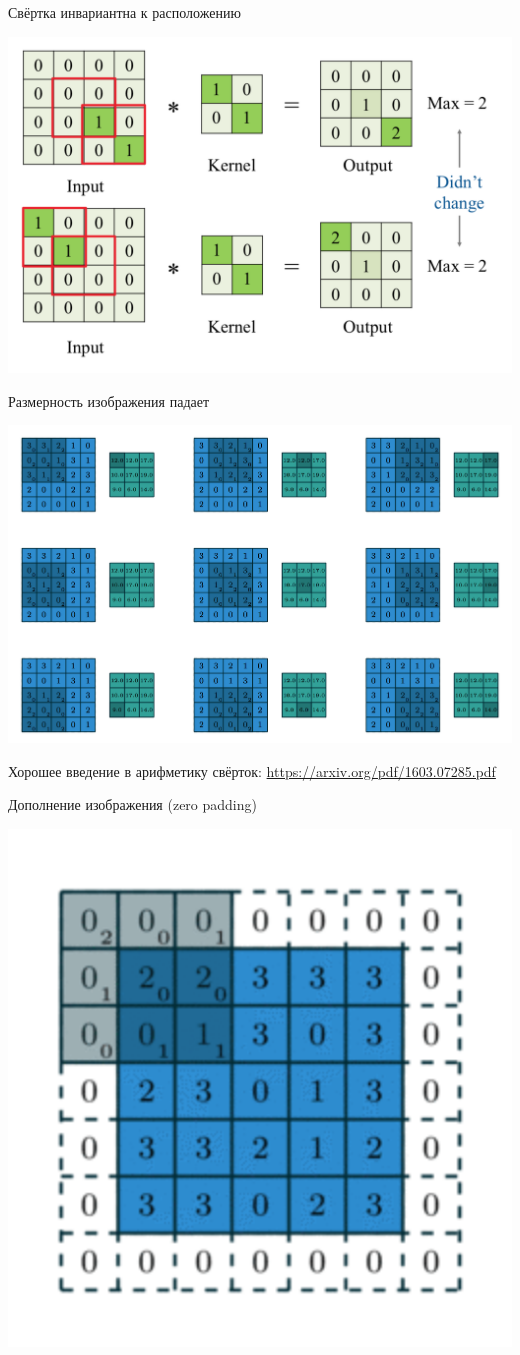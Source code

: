 \documentclass[notes,12pt, aspectratio=169]{beamer}
\begin{document}
\begin{frame}{Свёртка инвариантна к расположению}
\begin{center}
	\includegraphics[width=.8\linewidth]{conv_4.png}
\end{center}
\end{frame}


\begin{frame}{Размерность изображения падает}
\begin{center}
	\includegraphics[width=.8\linewidth]{step_by_step_conv.png}
\end{center}

\vfill %
\footnotesize
Хорошее введение в арифметику свёрток: {\color{blue} \url{https://arxiv.org/pdf/1603.07285.pdf}}
\end{frame}


\begin{frame}{Дополнение изображения (zero padding)}
\begin{center}
	\includegraphics[width=.4\linewidth]{padding.png}
\end{center}
\end{frame}
\end{document}
